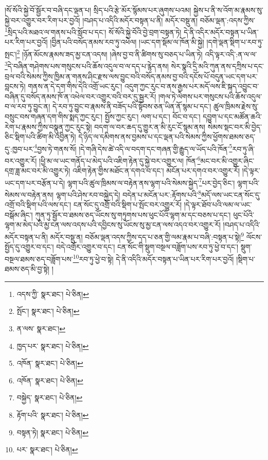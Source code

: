 །སོ་སོའི་སྐྱེ་བོ་སྦྱོར་བ་བཞི་དང་ལྡན་པ། སྲིད་པའི་རྩེ་མོར་སྙོམས་པར་ཞུགས་པའམ། སྐྱེས་པ་ནི་ས་འོག་མ་རྣམས་སུ་སྐྱེ་བར་འགྱུར་བར་རིག་པར་བྱའོ། །བཤད་པ་འདིའི་མདོར་བསྟན་པ་ནི། མདོར་བསྡུ་ན། བཅོམ་ལྡན་:འདས་ཀྱིས་\footnote{འདས་ཀྱི་  སྣར་ཐང་།  པེ་ཅིན། }སྲིད་པའི་མཐའ་ལ་གནས་པའི་སློབ་པ་དང་། སོ་སོའི་སྐྱེ་བོའི་བྱེ་བྲག་བསྟན་ཏེ། དེ་ནི་འདིར་མདོར་བསྟན་པ་ཡིན་པར་རིག་པར་བྱའོ། །བྱིན་པའི་བསོད་ནམས་རབ་ཏུ་འཕེལ། །ཡང་དག་སྡོམ་ལ་ཁོན་མི་སྐྱེ། །དགེ་ལྡན་སྡིག་པ་རབ་ཏུ་སྤང་།\footnote{སྤོང་།  སྣར་ཐང་།  པེ་ཅིན། } །ཉོན་མོངས་རྣམས་ཟད་མྱ་ངན་འདས། །ཞེས་བྱ་བ་ནི་ཚིགས་སུ་བཅད་པ་ཡིན་ཏེ། འདི་ལྟར་འདི་:ན་ལ་ལ་\footnote{ན་ལས་  སྣར་ཐང་། }དེ་བཞིན་གཤེགས་པས་གསུངས་པའི་ཆོས་འདུལ་བ་ལ་དད་པ་རྙེད་ནས། སེར་སྣའི་དྲི་མའི་ཀུན་ནས་དཀྲིས་པ་དང་བྲལ་བའི་སེམས་ཀྱིས་ཁྱིམ་ན་གནས་ཤིང་རྫས་ལས་བྱུང་བའི་བསོད་ནམས་བྱ་བའི་དངོས་པོ་བདུན་ཡང་དག་པར་བླངས་ཏེ། གནས་ན་དེ་དག་གིས་དེའི་འགྲོ་ཡང་རུང་། འདུག་ཀྱང་རུང་བ་ནས་རྒྱས་པར་མདོ་ལས་ཇི་སྐད་འབྱུང་བ་བཞིན་དུ་བསོད་ནམས་ཁོ་ན་འཕེལ་བར་འགྱུར་བའི་བར་དུ་སྦྱར་རོ། །གལ་ཏེ་ལེགས་པར་གསུངས་པའི་ཆོས་འདུལ་བ་ལ་རབ་ཏུ་བྱུང་ན། དེ་རབ་ཏུ་བྱུང་བ་རྣམས་ནི་བཟོད་པའི་སྟོབས་ཅན་ཡིན་ནོ་སྙམ་པ་དང་། ཚུལ་ཁྲིམས་རྗེས་སུ་བསྲུང་བས་གཞན་དག་གིས་སྨད་ཀྱང་རུང་། སྤྱོས་ཀྱང་རུང་། ལག་པ་དང་། བོང་བ་དང་། དབྱུག་པ་དང་མཚོན་ཆའི་རེག་པ་རྣམས་ཀྱིས་བསྣུན་ཀྱང་རུང་སྟེ། བདག་ལ་བར་ཆད་དུ་གྱུར་ན་མི་རུང་ངོ་སྙམ་ནས། སེམས་སྡང་བར་མི་བྱེད་ཅིང་སྡིག་པའི་ཚིག་མི་འབྱིན་ཏེ། དེ་ཉིད་ལ་དམིགས་ནས་བྱམས་པ་དང་ལྡན་པའི་སེམས་ཀྱིས་ཕྱོགས་ཐམས་ཅད་དུ་:ཁྱབ་པར་\footnote{ཁྱད་པར་  སྣར་ཐང་།  པེ་ཅིན། }བྱས་ཏེ་གནས་སོ། །དེ་གཞི་དེས་ཚེ་འདི་ལ་བདག་དང་གཞན་གྱི་རྒྱུད་ལ་ཡོད་པའི་ཁོན་\footnote{འཁོན་  སྣར་ཐང་།  པེ་ཅིན། }རབ་ཏུ་ཞི་བར་འགྱུར་རོ། །ཕྱི་མ་ལ་ཡང་གནོད་པ་མེད་པའི་འཇིག་རྟེན་དུ་སྐྱེ་བར་འགྱུར་ལ། ཁོན་\footnote{འཁོན་  སྣར་ཐང་།  པེ་ཅིན། }མང་བར་མི་འགྱུར་ཞིང་དགྲ་ཟླ་མང་བར་མི་འགྱུར་ཏེ། འཇིག་རྟེན་གྱིས་མཐོང་ན་དགའ་བ་དང་། མངོན་པར་དགའ་བར་འགྱུར་རོ། །དེ་ལྟར་ཡང་དག་པར་བརྩོན་པ་དེ། ལྷག་པའི་ཚུལ་ཁྲིམས་ལ་བརྟེན་ནས་ལྷག་པའི་སེམས་སྐྱེད་\footnote{བསྐྱེད་  སྣར་ཐང་།  པེ་ཅིན། }པར་བྱེད་ཅིང་། ལྷག་པའི་སེམས་ལ་བརྟེན་ནས། ལྷག་པའི་ཤེས་རབ་བསྐྱེད་དེ། བདེན་པ་མངོན་པར་:རྟོགས་པའི་\footnote{རྟོག་པའི་  སྣར་ཐང་།  པེ་ཅིན། }མདོ་ལས་ཡང་ངན་སོང་དུ་འགྲོ་བའི་སྡིག་པའི་ལས་དང་། ངན་སོང་དུ་འགྲོ་བའི་སྡིག་པ་སྤོང་བར་འགྱུར་རོ། །དེ་ལྟར་ཐོབ་པའི་ལམ་ལ་ཡང་བསྒོམ་ཞིང་། ཀུན་ཏུ་སྦྱོར་བ་ཐམས་ཅད་ཡོངས་སུ་གཏུགས་པས་ཕུང་པོའི་ལྷག་མ་དང་བཅས་པ་དང་། ཕུང་པོའི་ལྷག་མ་མེད་པའི་མྱ་ངན་ལས་འདས་པའི་དབྱིངས་སུ་ཡོངས་སུ་མྱ་ངན་ལས་འདའ་བར་འགྱུར་རོ། །བཤད་པ་འདིའི་མདོར་བསྟན་པ་ནི། མདོར་བསྡུ་ན། བཅོམ་ལྡན་འདས་ཀྱིས་དད་པ་ཅན་གྱི་ལམ་རྣམ་པ་བཞི་:བསྟན་པ་སྟེ།\footnote{བསྟན་ཏེ།  སྣར་ཐང་།  པེ་ཅིན། } ལོངས་སྤྱོད་དུ་འགྱུར་བ་དང་། བདེ་འགྲོར་འགྱུར་བ་དང་། ངན་སོང་གི་སྡུག་བསྔལ་བཟློག་པས་རབ་ཏུ་ཕྱེ་བ་དང་། སྡུག་བསྔལ་ཐམས་ཅད་བཟློག་པས་\footnote{པར་  སྣར་ཐང་།  པེ་ཅིན། }རབ་ཏུ་ཕྱེ་བ་སྟེ། དེ་ནི་འདིའི་མདོར་བསྟན་པ་ཡིན་པར་རིག་པར་བྱའོ། །སྡིག་པ་ཐམས་ཅད་མི་བྱ་སྟེ། །
